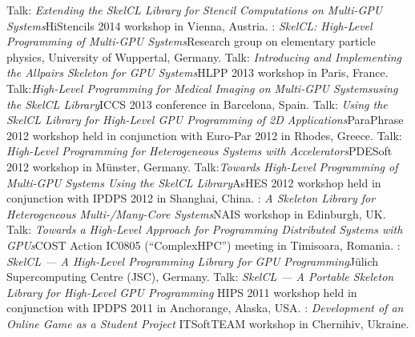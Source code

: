          {Talk: \emph{Extending the SkelCL Library for Stencil
          Computations on Multi-GPU Systems}\newline \small HiStencils 2014
          workshop in Vienna, Austria.}
         {: \emph{SkelCL\@: High-Level Programming of Multi-GPU
          Systems}\newline \small Research group on elementary particle physics,
          University of Wuppertal, Germany.}
         {Talk: \emph{Introducing and Implementing the Allpairs Skeleton for GPU
          Systems}\newline \small HLPP 2013 workshop in Paris, France.}
         {Talk:\emph{High-Level Programming for Medical Imaging on Multi-GPU
          Systems\newline using the SkelCL Library}\newline \small ICCS 2013 conference in
          Barcelona, Spain.}
       {Talk: \emph{Using the SkelCL Library for High-Level GPU Programming of
        2D Applications}\newline \small ParaPhrase 2012 workshop held in
        conjunction with Euro-Par 2012 in Rhodes, Greece.}
       {Talk: \emph{High-Level Programming for Heterogeneous Systems with
        Accelerators}\newline \small PDESoft 2012 workshop in Münster, Germany.}
       {Talk:\emph{Towards High-Level Programming of Multi-GPU Systems Using
        the SkelCL Library}\newline \small AsHES 2012 workshop held in
        conjunction with IPDPS 2012 in Shanghai, China.}
       {: \emph{A Skeleton Library for Heterogeneous
        Multi-/Many-Core Systems}\newline \small NAIS workshop in Edinburgh, UK.}
       {Talk: \emph{Towards a High-Level Approach for Programming Distributed
        Systems with GPUs}\newline \small COST Action IC0805 (``ComplexHPC'')
        meeting in Timisoara, Romania.}
       {: \emph{SkelCL --- A High-Level Programming Library for GPU
        Programming}\newline \small Jülich Supercomputing Centre (JSC), Germany.}
       {Talk: \emph{SkelCL --- A Portable Skeleton Library for High-Level
        GPU Programming}\newline
        \small HIPS 2011 workshop held in conjunction with IPDPS 2011 in
        Anchorange, Alaska, USA.}
       {: \emph{Development of an Online Game as a Student Project}\newline
        \small ITSoftTEAM workshop in Chernihiv, Ukraine.}
